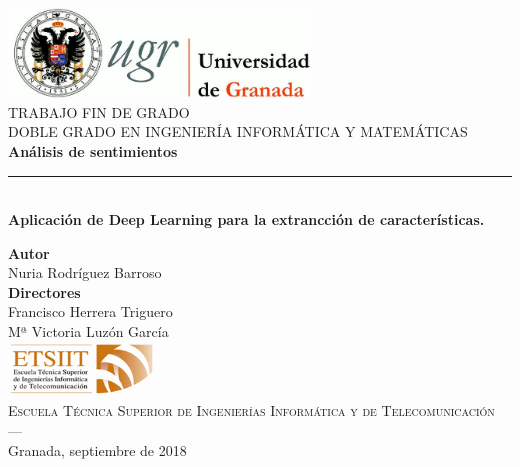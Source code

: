 \begin{titlepage}
 
\newlength{\centeroffset}
\setlength{\centeroffset}{-0.5\oddsidemargin}
\addtolength{\centeroffset}{0.5\evensidemargin}
\thispagestyle{empty}

\noindent\hspace*{\centeroffset}\begin{minipage}{\textwidth}

\centering
\includegraphics[width=0.6\textwidth]{imagenes/logo_ugr.jpg}\\[1.4cm]

\textsc{ \Large TRABAJO FIN DE GRADO\\[0.2cm]}
\textsc{ DOBLE GRADO EN INGENIERÍA INFORMÁTICA Y MATEMÁTICAS}\\[1cm]
% 
{\Huge\bfseries Análisis de sentimientos \\
}
\noindent\rule[-1ex]{\textwidth}{3pt}\\[3.5ex]
{\large\bfseries Aplicación de Deep Learning para la extrancción de características.}
\end{minipage}

\vspace{0.1cm}
\noindent\hspace*{\centeroffset}\begin{minipage}{\textwidth}
\centering

\textbf{Autor}\\ {Nuria Rodríguez Barroso}\\[2.5ex]
\textbf{Directores}\\
{Francisco Herrera Triguero\\
Mª Victoria Luzón García}\\[2cm]
\includegraphics[width=0.3\textwidth]{imagenes/etsiit_logo.png}\\[0.1cm]
\textsc{Escuela Técnica Superior de Ingenierías Informática y de Telecomunicación}\\
\textsc{---}\\
Granada, septiembre de 2018
\end{minipage}
\end{titlepage}


